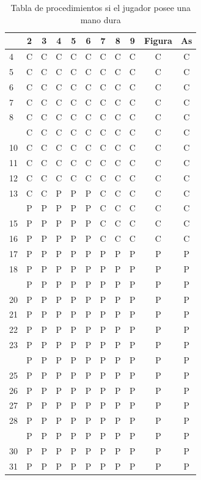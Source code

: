 \documentclass[12pt,a4paper,]{book}
\numberwithin{dummy}{section}
\theoremstyle{ocrenumbox}
\theoremstyle{blacknumex}
\theoremstyle{blacknumbox}
\theoremstyle{ocrenum}
\theoremstyle{ocrenum}
\begin{document}
\begin{longtable}[t]{lcccccccccc}
\caption{\label{tab:unnamed-chunk-38}Tabla de procedimientos si el jugador posee una mano dura}\\
\toprule
 & 2 & 3 & 4 & 5 & 6 & 7 & 8 & 9 & Figura & As\\
\midrule
4 & C & C & C & C & C & C & C & C & C & C\\
5 & C & C & C & C & C & C & C & C & C & C\\
6 & C & C & C & C & C & C & C & C & C & C\\
7 & C & C & C & C & C & C & C & C & C & C\\
8 & C & C & C & C & C & C & C & C & C & C\\
\addlinespace
9 & C & C & C & C & C & C & C & C & C & C\\
10 & C & C & C & C & C & C & C & C & C & C\\
11 & C & C & C & C & C & C & C & C & C & C\\
12 & C & C & C & C & C & C & C & C & C & C\\
13 & C & C & P & P & P & C & C & C & C & C\\
\addlinespace
14 & P & P & P & P & P & C & C & C & C & C\\
15 & P & P & P & P & P & C & C & C & C & C\\
16 & P & P & P & P & P & C & C & C & C & C\\
17 & P & P & P & P & P & P & P & P & P & P\\
18 & P & P & P & P & P & P & P & P & P & P\\
\addlinespace
19 & P & P & P & P & P & P & P & P & P & P\\
20 & P & P & P & P & P & P & P & P & P & P\\
21 & P & P & P & P & P & P & P & P & P & P\\
22 & P & P & P & P & P & P & P & P & P & P\\
23 & P & P & P & P & P & P & P & P & P & P\\
\addlinespace
24 & P & P & P & P & P & P & P & P & P & P\\
25 & P & P & P & P & P & P & P & P & P & P\\
26 & P & P & P & P & P & P & P & P & P & P\\
27 & P & P & P & P & P & P & P & P & P & P\\
28 & P & P & P & P & P & P & P & P & P & P\\
\addlinespace
29 & P & P & P & P & P & P & P & P & P & P\\
30 & P & P & P & P & P & P & P & P & P & P\\
31 & P & P & P & P & P & P & P & P & P & P\\
\bottomrule
\end{longtable}
\endgroup{}
\end{document}
